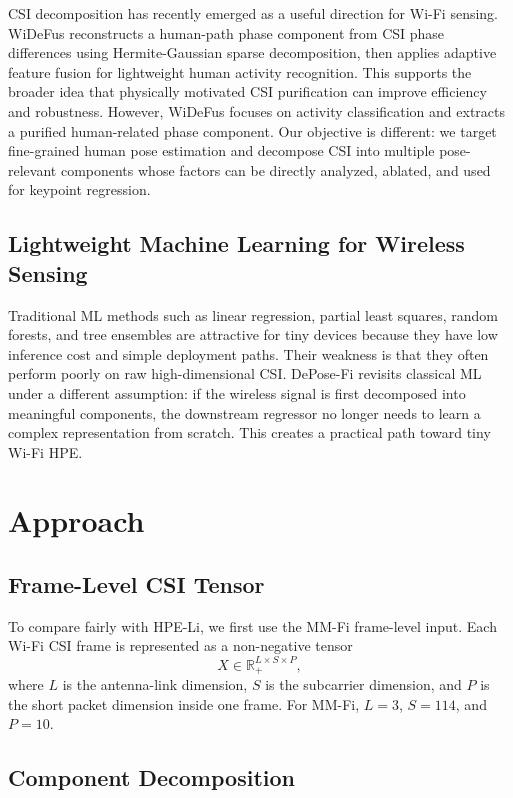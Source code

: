 CSI decomposition has recently emerged as a useful direction for Wi-Fi sensing. WiDeFus reconstructs a human-path phase component from CSI phase differences using Hermite-Gaussian sparse decomposition, then applies adaptive feature fusion for lightweight human activity recognition. This supports the broader idea that physically motivated CSI purification can improve efficiency and robustness. However, WiDeFus focuses on activity classification and extracts a purified human-related phase component. Our objective is different: we target fine-grained human pose estimation and decompose CSI into multiple pose-relevant components whose factors can be directly analyzed, ablated, and used for keypoint regression.

\subsection{Lightweight Machine Learning for Wireless Sensing}

Traditional ML methods such as linear regression, partial least squares, random forests, and tree ensembles are attractive for tiny devices because they have low inference cost and simple deployment paths. Their weakness is that they often perform poorly on raw high-dimensional CSI. DePose-Fi revisits classical ML under a different assumption: if the wireless signal is first decomposed into meaningful components, the downstream regressor no longer needs to learn a complex representation from scratch. This creates a practical path toward tiny Wi-Fi HPE.

\section{Approach}

\subsection{Frame-Level CSI Tensor}

To compare fairly with HPE-Li, we first use the MM-Fi frame-level input. Each Wi-Fi CSI frame is represented as a non-negative tensor
\begin{equation}
    X \in \mathbb{R}_{+}^{L \times S \times P},
\end{equation}
where $L$ is the antenna-link dimension, $S$ is the subcarrier dimension, and $P$ is the short packet dimension inside one frame. For MM-Fi, $L=3$, $S=114$, and $P=10$.

\subsection{Component Decomposition}

